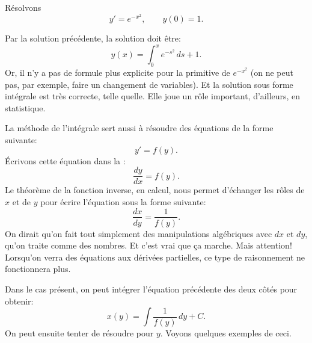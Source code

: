 \begin{example}
	Résolvons
	\begin{equation*}
		y' = e^{-x^2}, \qquad y(0) = 1 .
	\end{equation*}

	Par la solution précédente, la solution doit être:
	\begin{equation*}
		y(x) = \int_0^x e^{-s^2} \,ds + 1 .
	\end{equation*}
	Or, il n'y a pas de formule plus explicite pour la primitive de $e^{-x^2}$
	(on ne peut pas, par exemple, faire un changement de variables).
	Et la solution sous forme intégrale est très correcte, telle quelle.
	Elle joue un rôle important, d'ailleurs, en statistique.
\end{example}

La méthode de l'intégrale sert aussi à résoudre des équations de la forme suivante:
\begin{equation*}
	y' = f(y) .
\end{equation*}
Écrivons cette équation dans la :
\begin{equation*}
	\frac{dy}{dx} = f(y) .
\end{equation*}
Le théorème de la fonction inverse, en calcul, nous permet d'échanger les rôles de $x$ et de $y$ pour écrire l'équation sous la forme suivante:
\begin{equation*}
	\frac{dx}{dy} = \frac{1}{f(y)} .
\end{equation*}
On dirait qu'on fait tout simplement des manipulations algébriques avec $dx$ et $dy$, qu'on traite comme des nombres.
Et c'est vrai que ça marche.
Mais attention! Lorsqu'on verra des équations aux dérivées partielles, ce type de raisonnement ne fonctionnera plus.

Dans le cas présent, on peut intégrer l'équation précédente des deux côtés pour obtenir:
\begin{equation*}
	x(y) = \int \frac{1}{f(y)} \,dy + C .
\end{equation*}
On peut ensuite tenter de résoudre pour $y$.  Voyons quelques exemples de ceci.

